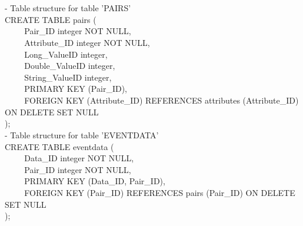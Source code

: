 \documentclass[11pt]{article}
\begin{document}
\begin{itemize}
- Table structure for table 'PAIRS'\\
CREATE TABLE pairs (\\
\verb+    +  Pair\_ID integer NOT NULL,\\
\verb+    +  Attribute\_ID integer NOT NULL,\\
\verb+    +  Long\_ValueID integer,\\
\verb+    +  Double\_ValueID integer,\\
\verb+    +  String\_ValueID integer,\\
\verb+    +  PRIMARY KEY (Pair\_ID),\\
\verb+    +  FOREIGN KEY (Attribute\_ID) REFERENCES attributes (Attribute\_ID) ON DELETE SET NULL\\
);\\

- Table structure for table 'EVENTDATA'\\
CREATE TABLE eventdata (\\
\verb+    +  Data\_ID integer NOT NULL,\\
\verb+    +  Pair\_ID integer NOT NULL,\\
\verb+    +  PRIMARY KEY (Data\_ID, Pair\_ID),\\
\verb+    +  FOREIGN KEY (Pair\_ID) REFERENCES pairs (Pair\_ID) ON DELETE SET NULL\\
);\\


\end{itemize}
\end{document}
